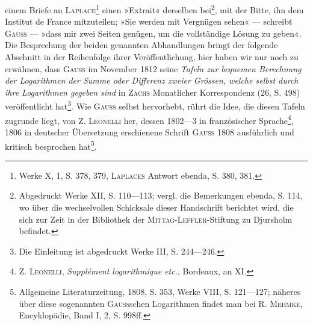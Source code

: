 \clearpage{}
\noindent einem Briefe an \textsc{Laplace}\footnote{Werke X, 1, S. 378, 379, \textsc{Laplaces} Antwort ebenda, S. 380, 381.} einen »Extrait« derselben bei\footnote{Abgedruckt Werke XII, S. 110—113; vergl. die Bemerkungen ebenda, S. 114, wo über die wechselvollen Schicksale dieser Handschrift berichtet wird, die sich zur Zeit in der Bibliothek der \textsc{Mittag-Leffler}-Stiftung zu Djursholm befindet.}, mit der Bitte,
ihn dem Institut de France mitzuteilen; »Sie werden mit Vergnügen sehen« —
schreibt \textsc{Gauss} — »dass mir zwei Seiten genügen, um die vollständige Lösung zu
geben«. Die Besprechung der beiden genannten Abhandlungen bringt der folgende
Abschnitt in der Reihenfolge ihrer Veröffentlichung, hier haben wir nur
noch zu erwähnen, dass \textsc{Gauss} im November 1812 seine \textit{Tafeln zur bequemen Berechnung
der Logarithmen der Summe oder Differenz zweier Grössen, welche selbst
durch ihre Logarithmen gegeben sind} in \textsc{Zachs} Monatlicher Korrespondenz (26,
S. 498) veröffentlicht hat\footnote{Die Einleitung ist abgedruckt Werke III, S. 244—246.}. Wie \textsc{Gauss} selbst hervorhebt, rührt die Idee,
die diesen Tafeln zugrunde liegt, von Z. \textsc{Leonelli} her, dessen 1802—3 in
französischer Sprache\footnote{Z. \textsc{Leonelli}, \textit{Supplément logarithmique etc.}, Bordeaux, an XI.}, 1806 in deutscher Übersetzung erschienene Schrift
\textsc{Gauss} 1808 ausführlich und kritisch besprochen hat\footnote{Allgemeine Literaturzeitung, 1808, S. 353, Werke VIII, S. 121—127; näheres über diese sogenannten \textsc{Gauss}schen Logarithmen findet man bei R. \textsc{Mehmke}, Encyklopädie, Band I, 2, S. 998ff.}.\par
